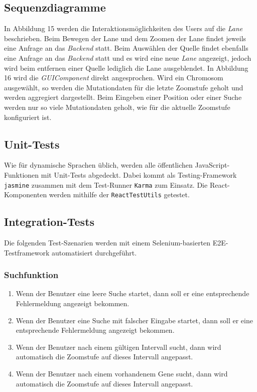 \subsection{Sequenzdiagramme}
In Abbildung 15 werden die Interaktionsmöglichkeiten des Users auf die \textit{Lane} beschrieben. Beim Bewegen der Lane und dem Zoomen der Lane findet jeweils eine Anfrage an das \textit{Backend} statt. Beim Auswählen der Quelle findet ebenfalls eine Anfrage an das \textit{Backend} statt und es wird eine neue \textit{Lane} angezeigt, jedoch wird beim entfernen einer Quelle lediglich die Lane ausgeblendet.
In Abbildung 16 wird die \textit{GUIComponent} direkt angesprochen. Wird ein Chromosom ausgewählt, so werden die Mutationdaten für die letzte Zoomstufe geholt und werden aggregiert dargestellt. Beim Eingeben einer Position oder einer Suche werden nur so viele Mutationdaten geholt, wie für die aktuelle Zoomstufe konfiguriert ist.

\subsection{Unit-Tests}
Wie für dynamische Sprachen üblich, werden alle öffentlichen JavaScript-Funktionen mit Unit-Tests abgedeckt. Dabei kommt als Testing-Framework \texttt{jasmine} zusammen mit dem Test-Runner \texttt{Karma} zum Einsatz. Die React-Komponenten werden mithilfe der \texttt{ReactTestUtils} getestet.

\subsection{Integration-Tests}
Die folgenden Test-Szenarien werden mit einem Selenium-basierten E2E-Testframework automatisiert durchgeführt.
\subsubsection{Suchfunktion}
\begin{enumerate}
	\item Wenn der Benutzer eine leere Suche startet, dann soll er eine entsprechende Fehlermeldung angezeigt bekommen.
	\item Wenn der Benutzer eine Suche mit falscher Eingabe startet, dann soll er eine entsprechende Fehlermeldung angezeigt bekommen.
	\item Wenn der Benutzer nach einem gültigen Intervall sucht, dann wird automatisch die Zoomstufe auf dieses Intervall angepasst.
	\item Wenn der Benutzer nach einem vorhandenem Gene sucht, dann wird automatisch die Zoomstufe auf dieses Intervall angepasst.
\end{enumerate}

